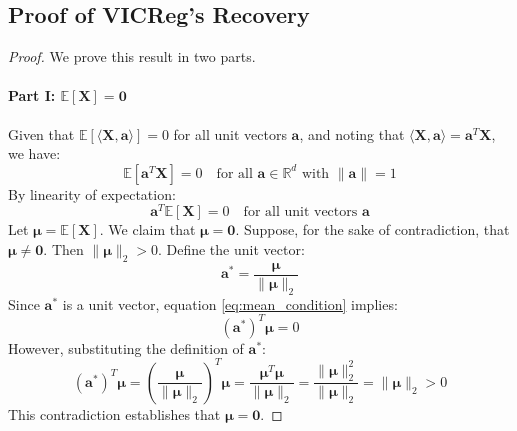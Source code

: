 \subsection{Proof of VICReg's Recovery}
\label{proof:vcreg}
\begin{proof}
We prove this result in two parts.
\paragraph{Part I: $\mathbb{E}[\mathbf{X}] = \mathbf{0}$}
Given that $\mathbb{E}[\langle \mathbf{X}, \mathbf{a} \rangle] = 0$ for all unit vectors $\mathbf{a}$, and noting that $\langle \mathbf{X}, \mathbf{a} \rangle = \mathbf{a}^T \mathbf{X}$, we have:
\begin{equation}\label{eq:mean_condition}
\mathbb{E}[\mathbf{a}^T \mathbf{X}] = 0 \quad \text{for all } \mathbf{a} \in \mathbb{R}^d \text{ with } \|\mathbf{a}\| = 1
\end{equation}
By linearity of expectation:
\begin{equation}
\mathbf{a}^T \mathbb{E}[\mathbf{X}] = 0 \quad \text{for all unit vectors } \mathbf{a}
\end{equation}
Let $\boldsymbol{\mu} = \mathbb{E}[\mathbf{X}]$. We claim that $\boldsymbol{\mu} = \mathbf{0}$.
Suppose, for the sake of contradiction, that $\boldsymbol{\mu} \neq \mathbf{0}$. Then $\|\boldsymbol{\mu}\|_2 > 0$. Define the unit vector:
\begin{equation}
\mathbf{a}^* = \frac{\boldsymbol{\mu}}{\|\boldsymbol{\mu}\|_2}
\end{equation}
Since $\mathbf{a}^*$ is a unit vector, equation \eqref{eq:mean_condition} implies:
\begin{equation}
(\mathbf{a}^*)^T \boldsymbol{\mu} = 0
\end{equation}
However, substituting the definition of $\mathbf{a}^*$:
\begin{equation}
(\mathbf{a}^*)^T \boldsymbol{\mu} = \left(\frac{\boldsymbol{\mu}}{\|\boldsymbol{\mu}\|_2}\right)^T \boldsymbol{\mu} = \frac{\boldsymbol{\mu}^T \boldsymbol{\mu}}{\|\boldsymbol{\mu}\|_2} = \frac{\|\boldsymbol{\mu}\|_2^2}{\|\boldsymbol{\mu}\|_2} = \|\boldsymbol{\mu}\|_2 > 0
\end{equation}
This contradiction establishes that $\boldsymbol{\mu} = \mathbf{0}$.

\end{proof}
